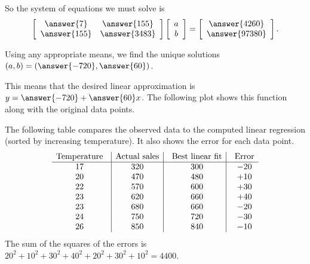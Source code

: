 \documentclass{ximera}
\begin{document}
\begin{example}
So the system of equations we must solve is
\begin{equation*}
  \startmat{cc}
    \answer{7} & \answer{155} \\
    \answer{155} & \answer{3483}
  \stopmat
  \startmat{c} a \\ b \stopmat
  =
  \startmat{c}
    \answer{4260} \\
    \answer{97380}
  \stopmat.
\end{equation*}

  Using any appropriate means, we find the unique solutions
  $(a,b)=(\answer{-720},\answer{60})$. 
  
  This means that the desired linear approximation
  is $y=\answer{-720} + \answer{60}x$. The following plot shows this function along with
  the original data points.

  \begin{center}
  \end{center}
  The following table compares the observed data to the computed
  linear regression (sorted by increasing temperature). It also shows
  the error for each data point.
  \begin{equation*}
    \begin{array}{c@{~~~}|c|@{~~~}c|@{~~~}c}
      \mbox{Temperature} & \mbox{Actual sales} & \mbox{Best linear fit} & \mbox{Error}\\\hline
      17 & 320 & 300 & -20 \\
      20 & 470 & 480 & +10 \\
      22 & 570 & 600 & +30 \\
      23 & 620 & 660 & +40 \\
      23 & 680 & 660 & -20 \\
      24 & 750 & 720 & -30 \\
      26 & 850 & 840 & -10 \\
    \end{array}
  \end{equation*}
  The sum of the squares of the errors is $20^2 + 10^2 + 30^2 + 40^2 + 20^2 + 30^2 + 10^2 = 4400$.
\end{example}
\end{document}
